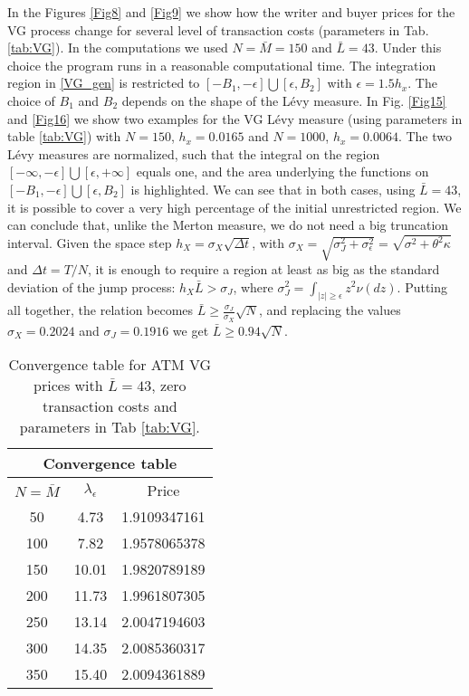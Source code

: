 In the Figures \ref{Fig8} and \ref{Fig9} we show how the writer and buyer prices for the VG process change for several level of transaction costs (parameters in Tab. \ref{tab:VG}). 
In the computations we used $N=\bar M = 150$ and $\bar L = 43$. Under this choice the program runs in a reasonable computational time. 
The integration region in \ref{VG_gen} is restricted to $[-B_1,-\epsilon]\bigcup [\epsilon,B_2]$ with $\epsilon=1.5h_x$. The choice of $B_1$ and $B_2$ depends on the shape of the 
L\'evy measure. 
In Fig. \ref{Fig15} and \ref{Fig16} we show two examples for the VG L\'evy measure (using parameters in table \ref{tab:VG}) with $N=150$, $h_x=0.0165$ and $N=1000$, $h_x=0.0064$. 
The two L\'evy measures are normalized, such that the integral on the region $[-\infty,-\epsilon]\bigcup [\epsilon,+\infty]$ equals one, and the 
area underlying the functions on $[-B_1,-\epsilon]\bigcup [\epsilon,B_2]$ is highlighted.
We can see that in both cases, using $\bar L = 43$, it is possible to cover a very high percentage of the initial unrestricted region. We can conclude that, unlike the Merton
measure, we do not need a big truncation interval.
Given the space step $h_X = \sigma_X\sqrt{\Delta t}$, with  
$ \sigma_X = \sqrt{\sigma_J^2 + \sigma_{\epsilon}^2} = \sqrt{\sigma^2+\theta^2 \kappa}$ 
and $\Delta t = T/N$, it is enough to require a region at least as big as the standard deviation of the jump process: 
$h_X \bar L > \sigma_J$, where  
$\sigma_J^2 = \int_{|z| \geq \epsilon} z^2 \nu(dz) $.
Putting all together, the relation becomes $\bar L\geq \frac{\sigma_J}{\sigma_X} \sqrt{N}$, and replacing the values $\sigma_X = 0.2024$ and $\sigma_J=0.1916$ 
we get $\bar L \geq 0.94 \sqrt{N}$.
\begin{table}[h!]
\begin{center}
\begin{minipage}{0.8\linewidth}
\centering
 \begin{tabular}{||c|c|c||}
 \hline
  \multicolumn{3}{|c|}{Convergence table} \\
  \hline
  $N = \bar M$ & $\lambda_{\epsilon}$ & Price \\
  \hline
    50 & 4.73 & 1.9109347161 \\
  \hline
    100 & 7.82 & 1.9578065378  \\
  \hline  
    150 & 10.01 & 1.9820789189  \\
  \hline
    200 & 11.73 & 1.9961807305 \\
  \hline   
    250 & 13.14 & 2.0047194603  \\
  \hline
    300 & 14.35 & 2.0085360317 \\ 
  \hline
    350 & 15.40 & 2.0094361889  \\
  \hline
  \end{tabular}
  \caption{Convergence table for ATM VG prices with $\bar L =43$, zero transaction costs and parameters in Tab \ref{tab:VG}.}
  \label{tab:convergence4}
\end{minipage}
 \end{center}
\end{table}\\
